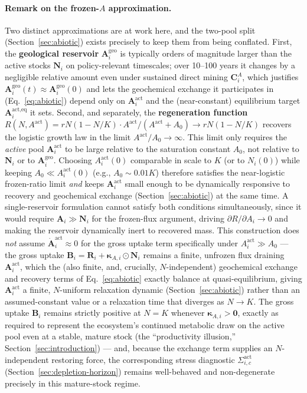 \documentclass[twocolumn,10pt]{article}
\begin{document}
\paragraph{Remark on the frozen-$A$ approximation.}
\label{sec:frozen-A}
Two distinct approximations are at work here, and the two-pool split (Section~\ref{sec:abiotic}) exists precisely to keep them from being conflated. First, the \textbf{geological reservoir} $\mathbf{A}^{\text{geo}}_i$ is typically orders of magnitude larger than the active stocks $\mathbf{N}_i$ on policy-relevant timescales; over 10--100 years it changes by a negligible relative amount even under sustained direct mining $\mathbf C^A_i$, which justifies $\mathbf{A}^{\text{geo}}_i(t) \approx \mathbf{A}^{\text{geo}}_i(0)$ and lets the geochemical exchange it participates in (Eq.~\eqref{eq:abiotic}) depend only on $\mathbf A^{\text{act}}_i$ and the (near-constant) equilibrium target $\mathbf A^{\text{act},\text{eq}}_i$ it sets. Second, and separately, the \textbf{regeneration function} $R(N,A^{\text{act}}) = rN(1-N/K)\cdot A^{\text{act}}/(A^{\text{act}}+A_0)\to rN(1-N/K)$ recovers the logistic growth law in the limit $A^{\text{act}}/A_0\to\infty$. This limit only requires the \emph{active} pool $\mathbf A^{\text{act}}_i$ to be large relative to the saturation constant $A_0$, not relative to $\mathbf N_i$ or to $\mathbf A^{\text{geo}}_i$. Choosing $A^{\text{act}}_i(0)$ comparable in scale to $K$ (or to $N_i(0)$) while keeping $A_0\ll A^{\text{act}}_i(0)$ (e.g., $A_0\sim0.01K$) therefore satisfies the near-logistic frozen-ratio limit \emph{and} keeps $\mathbf A^{\text{act}}_i$ small enough to be dynamically responsive to recovery and geochemical exchange (Section~\ref{sec:abiotic}) at the same time. A single-reservoir formulation cannot satisfy both conditions simultaneously, since it would require $\mathbf A_i\gg\mathbf N_i$ for the frozen-flux argument, driving $\partial R/\partial A_i\to0$ and making the reservoir dynamically inert to recovered mass. This construction does \emph{not} assume $\dot{\mathbf{A}}^{\text{act}}_i\approx0$ for the gross uptake term specifically under $A^{\text{act}}_i\gg A_0$ — the gross uptake $\mathbf B_i=\mathbf R_i+\boldsymbol\kappa_{A,i}\odot\mathbf N_i$ remains a finite, unfrozen flux draining $\mathbf A^{\text{act}}_i$, which the (also finite, and, crucially, $N$-independent) geochemical exchange and recovery terms of Eq.~\eqref{eq:abiotic} exactly balance at quasi-equilibrium, giving $\mathbf A^{\text{act}}_i$ a finite, $N$-uniform relaxation dynamic (Section~\ref{sec:abiotic}) rather than an assumed-constant value or a relaxation time that diverges as $N\to K$. The gross uptake $\mathbf B_i$ remains strictly positive at $N=K$ whenever $\boldsymbol\kappa_{A,i}>\mathbf 0$, exactly as required to represent the ecosystem's continued metabolic draw on the active pool even at a stable, mature stock (the ``productivity illusion,'' Section~\ref{sec:introduction}) — and, because the exchange term supplies an $N$-independent restoring force, the corresponding stress diagnostic $\Sigma^{\text{act}}_{i,c}$ (Section~\ref{sec:depletion-horizon}) remains well-behaved and non-degenerate precisely in this mature-stock regime.
\end{document}
